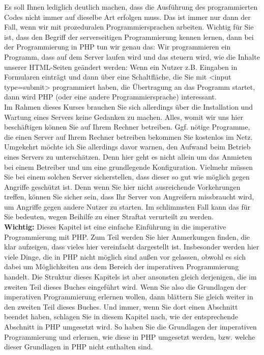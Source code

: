 Es soll Ihnen lediglich deutlich machen, dass die Ausführung des programmierten Codes nicht immer auf dieselbe Art erfolgen muss. Das ist immer nur dann der Fall, wenn wir mit prozeduralen Programmiersprachen arbeiten. Wichtig für Sie ist, dass den Begriff der serverseitigen Programmierung kennen lernen, dann bei der Programmierung in PHP tun wir genau das: Wir programmieren ein Programm, dass auf dem Server laufen wird und das steuern wird, wie die Inhalte unserer HTML-Seiten geändert werden: Wenn ein Nutzer z.B. Eingaben in Formularen einträgt und dann über eine Schaltfläche, die Sie mit <input type=submit> programmiert haben, die Übertragung an das Programm startet, dann wird PHP (oder eine andere Programmiersprache) interessant.\\


Im Rahmen dieses Kurses brauchen Sie sich allerdings über die Installation und Wartung eines Servers keine Gedanken zu machen. Alles, womit wir uns hier beschäftigen können Sie auf Ihrem Rechner betreiben. Ggf. nötige Programme, die einen Server auf Ihrem Rechner betreiben bekommen Sie kostenlos im Netz.\\


Umgekehrt möchte ich Sie allerdings davor warnen, den Aufwand beim Betrieb eines Servers zu unterschätzen. Denn hier geht es nicht allein um das Anmieten bei einem Betreiber und um eine grundlegende Konfiguration. Vielmehr müssen Sie bei einem solchen Server sicherstellen, dass dieser so gut wie möglich gegen Angriffe geschützt ist. Denn wenn Sie hier nicht ausreichende Vorkehrungen treffen, können Sie sicher sein, dass Ihr Server von Angreifern missbraucht wird, um Angriffe gegen andere Nutzer zu starten. Im schlimmsten Fall kann das für Sie bedeuten, wegen Beihilfe zu einer Straftat verurteilt zu werden.\\

\textbf{Wichtig:} Dieses Kapitel ist eine einfache Einführung in die imperative Programmierung mit PHP. Zum Teil werden Sie hier Anmerkungen finden, die klar aufzeigen, dass vieles hier vereinfacht dargestellt ist. Insbesonder werden hier viele Dinge, die in PHP nicht möglich sind außen vor gelassen, obwohl es sich dabei um Möglichkeiten aus dem Bereich der imperativen Programmierung handelt. Die Struktur dieses Kapitels ist aber ansonsten gleich derjenigen, die im zweiten Teil dieses Buches eingeführt wird. Wenn Sie also die Grundlagen der imperativen Programmierung erlernen wollen, dann blättern Sie gleich weiter in den zweiten Teil dieses Buches. Und immer, wenn Sie dort einen Abschnitt beendet haben, schlagen Sie in diesem Kapitel nach, wie der entsprechende Abschnitt in PHP umgesetzt wird. So haben Sie die Grundlagen der imperativen Programmierung und erlernen, wie diese in PHP umgesetzt werden, bzw. welche dieser Grundlagen in PHP nicht enthalten sind.

